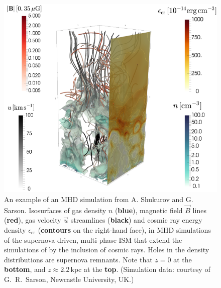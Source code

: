 \documentclass[12pt]{article}
\newcommand{\imagineSW}{\textsl{IMAGINE}}
\begin{document}



\begin{figure}[t]\centering
\includegraphics[width=0.7\columnwidth]{CR_box_low-res.png}
\caption{ An example of an MHD simulation from A. Shukurov and G. Sarson. Isosurfaces of gas density $n$ ({\bf blue}), magnetic field $\vec{B}$ lines ({\bf red}), gas 
velocity $\vec{u}$ streamlines ({\bf black}) and cosmic ray energy density $\epsilon_{\mathrm{cr}}$ ({\bf contours} 
on the right-hand face), in MHD simulations of the supernova-driven, multi-phase ISM 
that extend the simulations of 
\citet{Gent:2013b} 
by the inclusion 
of cosmic rays. Holes in the density distributions are supernova remnants. Note that 
$z=0$ at the \textbf{bottom}, and $z\approx 2.2$\,kpc at the \textbf{top}. 
(Simulation data: courtesy of G.~R.~Sarson, Newcastle University, UK.)
\label{fig:mhd}
}
\end{figure}
\end{document}
